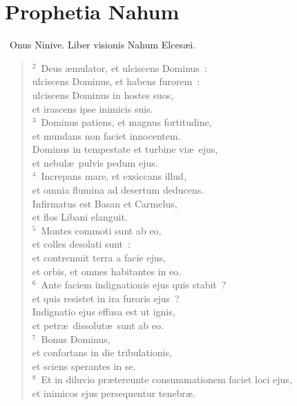 {\centering \section*{Prophetia Nahum}}\thispagestyle{empty}

~Onus Ninive. Liber visionis Nahum Elces\ae i.


\begin{flushleft}\begin{verse}\vspace{6pt}${}^{2}$~Deus \ae mulator, et ulciscens Dominus~:\\ ulciscens Dominus, et habens furorem~:\\ ulciscens Dominus in hostes suos,\\ et irascens ipse inimicis suis.\\
${}^{3}$~Dominus patiens, et magnus fortitudine,\\ et mundans non faciet innocentem.\\ Dominus in tempestate et turbine vi\ae\ ejus,\\ et nebul\ae\ pulvis pedum ejus.\\
${}^{4}$~Increpans mare, et exsiccans illud,\\ et omnia flumina ad desertum deducens.\\ Infirmatus est Basan et Carmelus,\\ et flos Libani elanguit.\\
${}^{5}$~Montes commoti sunt ab eo,\\ et colles desolati sunt~:\\ et contremuit terra a facie ejus,\\ et orbis, et omnes habitantes in eo.\\
${}^{6}$~Ante faciem indignationis ejus quis stabit~?\\ et quis resistet in ira furoris ejus~?\\ Indignatio ejus effusa est ut ignis,\\ et petr\ae\ dissolut\ae\ sunt ab eo.\\
${}^{7}$~Bonus Dominus,\\ et confortans in die tribulationis,\\ et sciens sperantes in se.\\
${}^{8}$~Et in diluvio pr\ae tereunte consummationem faciet loci ejus,\\ et inimicos ejus persequentur tenebr\ae .\\

\end{verse}
\end{flushleft}
